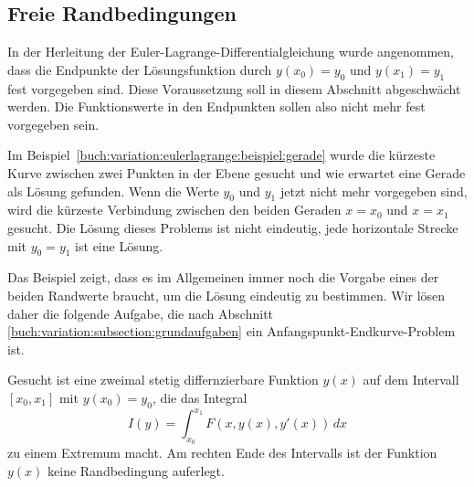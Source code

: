 %
%
%

%
%
\subsection{Freie Randbedingungen
\label{buch:variation:eulerlagrange:subsection:freierb}}
In der Herleitung der Euler-Lagrange-Differentialgleichung wurde angenommen,
dass die Endpunkte der Lösungsfunktion durch $y(x_0)=y_0$ und $y(x_1)=y_1$
fest vorgegeben sind.
Diese Voraussetzung soll in diesem Abschnitt abgeschwächt werden.
Die Funktionswerte in den Endpunkten sollen also nicht mehr fest
vorgegeben sein.

\begin{beispiel}
\label{buch:variation:eulerlagrange:beispiel:freiegerade}
Im Beispiel~\ref{buch:variation:eulerlagrange:beispiel:gerade}
wurde die kürzeste Kurve zwischen zwei Punkten in der Ebene
gesucht und wie erwartet eine Gerade als Lösung gefunden.
Wenn die Werte $y_0$ und $y_1$ jetzt nicht mehr vorgegeben sind,
wird die kürzeste Verbindung zwischen den beiden Geraden
$x=x_0$ und $x=x_1$ gesucht.
Die Lösung dieses Problems ist nicht eindeutig, jede horizontale
Strecke mit $y_0=y_1$ ist eine Lösung.
\end{beispiel}

Das Beispiel zeigt, dass es im Allgemeinen immer noch die Vorgabe
eines der beiden Randwerte braucht, um die Lösung eindeutig zu
bestimmen.
Wir lösen daher die folgende Aufgabe, die nach
Abschnitt \ref{buch:variation:subsection:grundaufgaben}
ein Anfangspunkt-Endkurve-Problem ist.

\begin{aufgabe}
Gesucht ist eine zweimal stetig differnzierbare Funktion $y(x)$ auf
dem Intervall $[x_0,x_1]$ mit $y(x_0)=y_0$, die das Integral
\[
I(y)
=
\int_{x_0}^{x_1} F(x,y(x),y'(x))\,dx
\]
zu einem Extremum macht.
Am rechten Ende des Intervalls ist der Funktion $y(x)$ keine
Randbedingung auferlegt.
\end{aufgabe}

